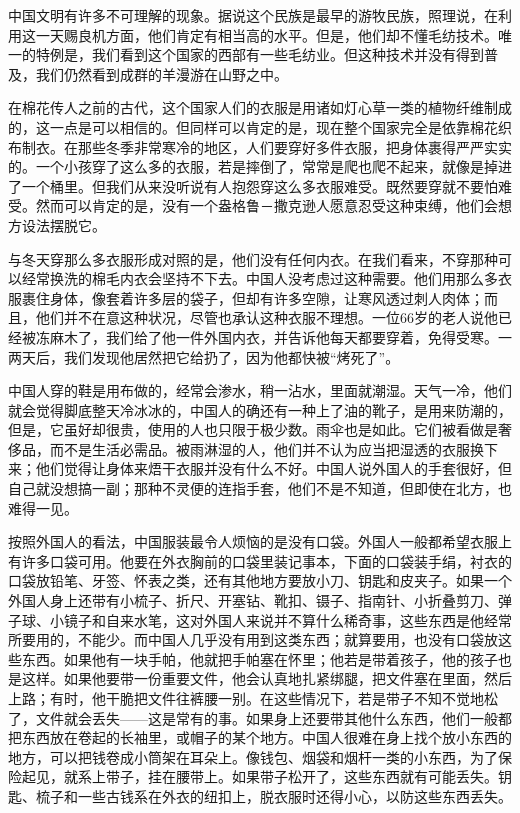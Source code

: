 \documentclass[12pt,oneside]{book}
\begin{document}
\begin{common-format}
中国文明有许多不可理解的现象。据说这个民族是最早的游牧民族，照理说，在利用这一天赐良机方面，他们肯定有相当高的水平。但是，他们却不懂毛纺技术。唯一的特例是，我们看到这个国家的西部有一些毛纺业。但这种技术并没有得到普及，我们仍然看到成群的羊漫游在山野之中。 

在棉花传人之前的古代，这个国家人们的衣服是用诸如灯心草一类的植物纤维制成的，这一点是可以相信的。但同样可以肯定的是，现在整个国家完全是依靠棉花织布制衣。在那些冬季非常寒冷的地区，人们要穿好多件衣服，把身体裹得严严实实的。一个小孩穿了这么多的衣服，若是摔倒了，常常是爬也爬不起来，就像是掉进了一个桶里。但我们从来没听说有人抱怨穿这么多衣服难受。既然要穿就不要怕难受。然而可以肯定的是，没有一个盎格鲁－撒克逊人愿意忍受这种束缚，他们会想方设法摆脱它。 

与冬天穿那么多衣服形成对照的是，他们没有任何内衣。在我们看来，不穿那种可以经常换洗的棉毛内衣会坚持不下去。中国人没考虑过这种需要。他们用那么多衣服裹住身体，像套着许多层的袋子，但却有许多空隙，让寒风透过刺人肉体；而且，他们并不在意这种状况，尽管也承认这种衣服不理想。一位66岁的老人说他已经被冻麻木了，我们给了他一件外国内衣，并告诉他每天都要穿着，免得受寒。一两天后，我们发现他居然把它给扔了，因为他都快被“烤死了”。 

中国人穿的鞋是用布做的，经常会渗水，稍一沾水，里面就潮湿。天气一冷，他们就会觉得脚底整天冷冰冰的，中国人的确还有一种上了油的靴子，是用来防潮的，但是，它虽好却很贵，使用的人也只限于极少数。雨伞也是如此。它们被看做是奢侈品，而不是生活必需品。被雨淋湿的人，他们并不认为应当把湿透的衣服换下来；他们觉得让身体来焐干衣服并没有什么不好。中国人说外国人的手套很好，但自己就没想搞一副；那种不灵便的连指手套，他们不是不知道，但即使在北方，也难得一见。 

按照外国人的看法，中国服装最令人烦恼的是没有口袋。外国人一般都希望衣服上有许多口袋可用。他要在外衣胸前的口袋里装记事本，下面的口袋装手绢，衬衣的口袋放铅笔、牙签、怀表之类，还有其他地方要放小刀、钥匙和皮夹子。如果一个外国人身上还带有小梳子、折尺、开塞钻、靴扣、镊子、指南针、小折叠剪刀、弹子球、小镜子和自来水笔，这对外国人来说并不算什么稀奇事，这些东西是他经常所要用的，不能少。而中国人几乎没有用到这类东西；就算要用，也没有口袋放这些东西。如果他有一块手帕，他就把手帕塞在怀里；他若是带着孩子，他的孩子也是这样。如果他要带一份重要文件，他会认真地扎紧绑腿，把文件塞在里面，然后上路；有时，他干脆把文件往裤腰一别。在这些情况下，若是带子不知不觉地松了，文件就会丢失——这是常有的事。如果身上还要带其他什么东西，他们一般都把东西放在卷起的长袖里，或帽子的某个地方。中国人很难在身上找个放小东西的地方，可以把钱卷成小筒架在耳朵上。像钱包、烟袋和烟杆一类的小东西，为了保险起见，就系上带子，挂在腰带上。如果带子松开了，这些东西就有可能丢失。钥匙、梳子和一些古钱系在外衣的纽扣上，脱衣服时还得小心，以防这些东西丢失。 


\end{common-format}
\end{document}
